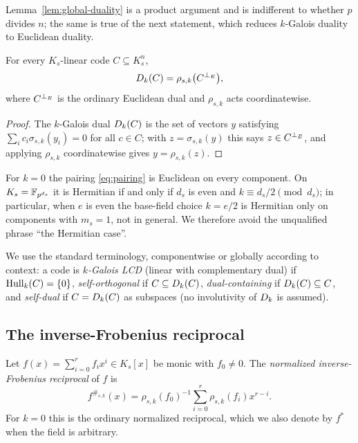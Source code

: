 Lemma~\ref{lem:global-duality} is a product argument and is indifferent to
whether $p$ divides $n$; the same is true of the next statement, which reduces
$k$-Galois duality to Euclidean duality.

\begin{proposition}\label{prop:dual-translation}
For every $K_s$-linear code $C\subseteq K_s^n$,
\[
D_k(C)=\rho_{s,k}\bigl(C^{\perp_{E}}\bigr),
\]
where $C^{\perp_{E}}$ is the ordinary Euclidean dual and $\rho_{s,k}$ acts
coordinatewise.
\end{proposition}

\begin{proof}
The $k$-Galois dual $D_k(C)$ is the set of vectors $y$ satisfying
$\sum_i c_i\sigma_{s,k}(y_i)=0$ for all $c\in C$; with
$z=\sigma_{s,k}(y)$ this says $z\in C^{\perp_{E}}$, and applying
$\rho_{s,k}$ coordinatewise gives $y=\rho_{s,k}(z)$.
\end{proof}

\begin{remark}\label{rem:euclidean-hermitian}
For $k=0$ the pairing \eqref{eq:pairing} is Euclidean on every component.  On
$K_s=\mathbb F_{p^{d_s}}$ it is Hermitian if and only if $d_s$ is even and
$k\equiv d_s/2\pmod{d_s}$; in particular, when $e$ is even the base-field
choice $k=e/2$ is Hermitian only on components with $m_s=1$, not in general.
We therefore avoid the unqualified phrase ``the Hermitian case''.
\end{remark}

We use the standard terminology, componentwise or globally according to
context: a code is \emph{$k$-Galois LCD} (linear with complementary dual) if
$\operatorname{Hull}_k(C)=\{0\}$, \emph{self-orthogonal} if $C\subseteq D_k(C)$,
\emph{dual-containing} if $D_k(C)\subseteq C$, and \emph{self-dual} if
$C=D_k(C)$ as subspaces (no involutivity of $D_k$ is assumed).

\subsection{The inverse-Frobenius reciprocal}\label{sec:reciprocal}

Let $f(x)=\sum_{i=0}^{r}f_ix^i\in K_s[x]$ be monic with $f_0\neq0$.  The
\emph{normalized inverse-Frobenius reciprocal} of $f$ is
\begin{equation}\label{eq:reciprocal}
f^{\#_{s,k}}(x)
   =\rho_{s,k}(f_0)^{-1}\sum_{i=0}^{r}\rho_{s,k}(f_i)x^{r-i}.
\end{equation}
For $k=0$ this is the ordinary normalized reciprocal, which we also denote by
$f^\ast$ when the field is arbitrary.

